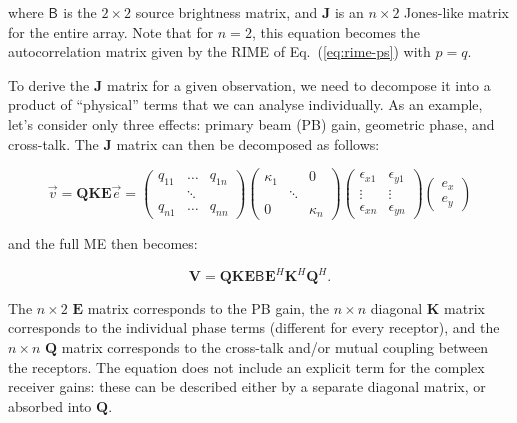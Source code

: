 \documentclass[]{aa}
\newcommand{\herm}{H}
\newcommand{\coh}[2]{\mathsf{{#1}}_{{#2}}}
\begin{document}
where $\coh{B}{}$ is the $2\times2$ source brightness matrix, and $\mathbf{J}$ is an $n\times2$ Jones-like matrix for the entire array. Note that for $n=2$, this equation becomes the autocorrelation matrix given by the RIME of Eq.~(\ref{eq:rime-ps}) with $p=q$.

To derive the $\mathbf{J}$ matrix for a given observation, we need to decompose it into a product of ``physical'' terms that we can
analyse individually. As an example, let's consider only three effects: primary beam (PB) gain, geometric phase, and cross-talk. The 
$\mathbf{J}$ matrix can then be decomposed as follows:

\begin{equation}\label{eq:array-response}
\vec v = \mathbf{QKE} \vec e =\left(\begin{array}{ccc}
q_{11} & \ldots & q_{1n}\\
 & \ddots\\
q_{n1} & \ldots & q_{nn}\end{array}\right)\left(\begin{array}{ccc}
\kappa_{1} &  & 0\\
 & \ddots & \\
0 &  & \kappa_{n}\end{array}\right)\left(\begin{array}{cc}
\epsilon_{x1} & \epsilon_{y1}\\
\vdots & \vdots\\
\epsilon_{xn} & \epsilon_{yn}\end{array}\right) 
\left(\begin{array}{c} e_x\\e_y
\end{array}\right)
\end{equation}


and the full ME then becomes:

\begin{equation}
\mathbf{V} = \mathbf{QKE} \coh{B}{} \mathbf{E}^\herm \mathbf{K}^\herm \mathbf{Q}^\herm.
\label{eq:array-me}
\end{equation}


The $n\times2$ \textbf{$\mathbf{E}$} matrix corresponds to the PB gain,
the $n\times n$ diagonal $\mathbf{K}$ matrix corresponds to the individual
phase terms (different for every receptor), and the $n\times n$ $\mathbf{Q}$
matrix corresponds to the cross-talk and/or mutual coupling between the
receptors. The equation does not include an explicit term for the 
complex receiver gains: these can be described either by a separate diagonal matrix,
or absorbed into $\mathbf{Q}$.
\end{document}
